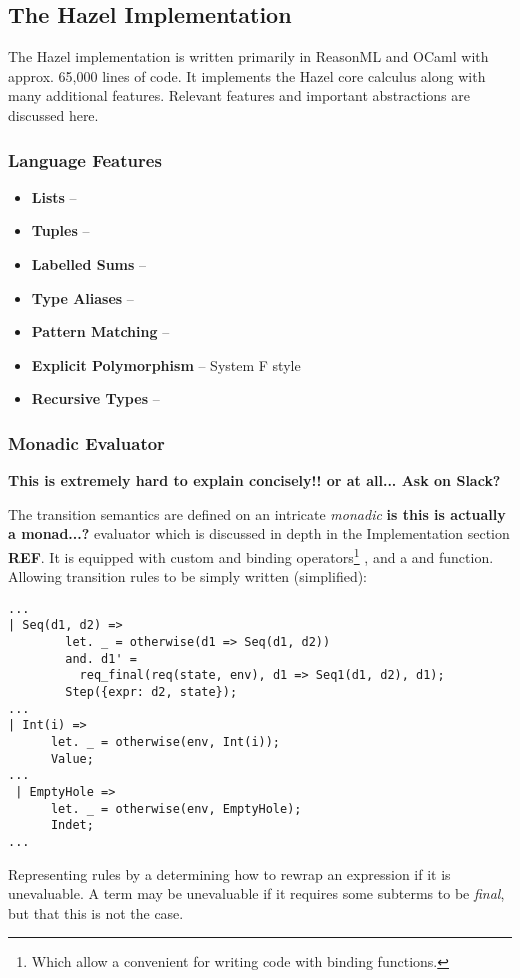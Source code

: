 \subsection{The Hazel Implementation}\label{sec:HazelImplementation}
The Hazel implementation \cite{HazelCode} is written primarily in ReasonML and OCaml with approx. 65,000 lines of code. It implements the Hazel core calculus along with many additional features. Relevant features and important abstractions are discussed here.

\subsubsection{Language Features}\label{sec:HazelAdditionalFeatures}
\begin{itemize}
\item \textbf{Lists} -- 
\item \textbf{Tuples} -- 
\item \textbf{Labelled Sums} -- 
\item \textbf{Type Aliases} -- 
\item \textbf{Pattern Matching} -- 
\item \textbf{Explicit Polymorphism} -- System F style
\item \textbf{Recursive Types} -- 
\end{itemize}

\subsubsection{Monadic Evaluator}\label{sec:HazelEvaluator}
\textbf{This is extremely hard to explain concisely!! or at all... Ask on Slack?}

The transition semantics are defined on an intricate \textit{monadic} \textbf{is this is actually a monad...?} evaluator which is discussed in depth in the Implementation section \textbf{REF}. It is equipped with custom  and  binding operators\footnote{Which allow a convenient for writing code with binding functions.} \cite{OCamlManual}, and a  and  function. Allowing transition rules to be simply written (simplified):
\begin{verbatim}
...
| Seq(d1, d2) =>
        let. _ = otherwise(d1 => Seq(d1, d2))
        and. d1' = 
          req_final(req(state, env), d1 => Seq1(d1, d2), d1);
        Step({expr: d2, state});
...
| Int(i) =>
      let. _ = otherwise(env, Int(i));
      Value;
...
 | EmptyHole =>
      let. _ = otherwise(env, EmptyHole);
      Indet;
...
\end{verbatim}
Representing rules by a  determining how to rewrap an expression if it is unevaluable. A term may be unevaluable if it requires some subterms to be \textit{final}, but that this is not the case. 

